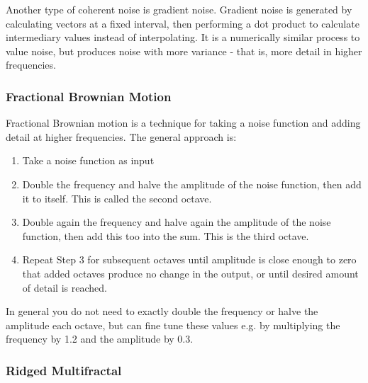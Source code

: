 

Another type of coherent noise is gradient noise.
Gradient noise is generated by calculating vectors at a fixed interval, then performing a dot product to calculate intermediary values instead of interpolating.
It is a numerically similar process to value noise, but produces noise with more variance - that is, more detail in higher frequencies.


\subsubsection{Fractional Brownian Motion}

Fractional Brownian motion is a technique for taking a noise function and adding detail at higher frequencies.
The general approach is:
\begin{enumerate}
\item Take a noise function as input
\item Double the frequency and halve the amplitude of the noise function, then add it to itself. This is called the second octave.
\item Double again the frequency and halve again the amplitude of the noise function, then add this too into the sum. This is the third octave.
\item Repeat Step 3 for subsequent octaves until amplitude is close enough to zero that added octaves produce no change in the output, or until desired amount of detail is reached.
\end{enumerate}

In general you do not need to exactly double the frequency or halve the amplitude each octave, but can fine tune these values e.g. by multiplying the frequency by 1.2 and the amplitude by 0.3.

\subsubsection{Ridged Multifractal}

